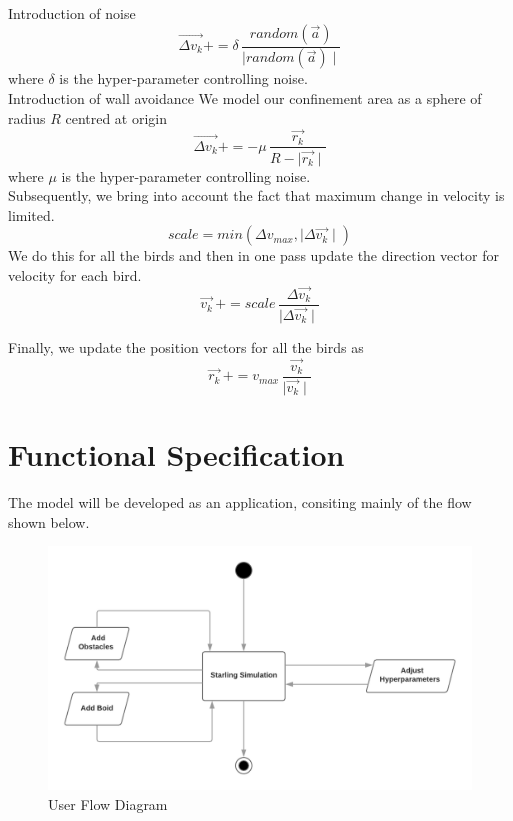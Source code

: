 \documentclass[a4paper,12pt,openany]{book}
\begin{document}
\noindent Introduction of noise 
\begin{equation}
	\vec{\Delta v_k} += \delta \, \frac{random(\vec{a}) }{\mid random(\vec{a}) \mid}
\end{equation}
where $\delta$ is the hyper-parameter controlling noise.\\

\noindent Introduction of wall avoidance
We model our confinement area as a sphere of radius $R$ centred at origin
\begin{equation}
	\vec{\Delta v_k} += -\mu \, \frac{\vec{r_k}}{R - \mid \vec{r_k} \mid}
\end{equation}
where $\mu$ is the hyper-parameter controlling noise.\\

Subsequently, we bring into account the fact that maximum change in velocity is limited.\\
\begin{equation}
	scale = min(\Delta v_{max} , \mid \Delta \vec{v_k} \mid)
\end{equation}
We do this for all the birds and then in one pass update the direction vector for velocity for each bird.
\begin{equation}
	\vec{v_k} \,+=  scale \, \frac{\Delta \vec{v_k}}{\mid \Delta \vec{v_k}\mid}
\end{equation}

\noindent Finally, we update the position vectors for all the birds as
\begin{equation}
	\vec{r_k} \,+=  v_{max} \, \frac{\vec{v_k}}{\mid \vec{v_k}\mid}
\end{equation}

\chapter{Functional Specification}

The model will be developed as an application, consiting mainly of the flow shown below. 

\begin{figure}[h]
\centering
\includegraphics[scale=0.9]{UserFlowDiagram}
\caption{User Flow Diagram}
\end{figure}
\end{document}
